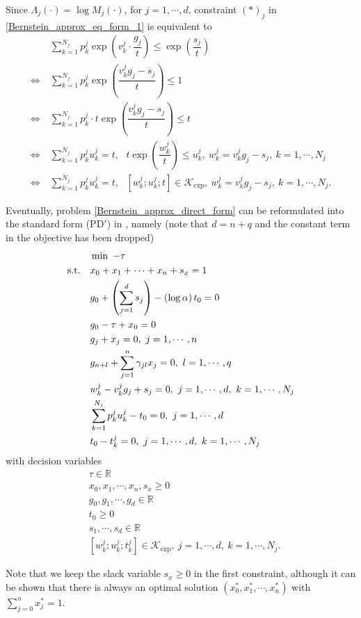 \documentclass[11pt]{article}
\begin{document}
Since $\Lambda_j\left(\cdot\right) = \log M_j \left(\cdot\right)$, for $j=1, \cdots, d$, constraint $(*)_j$ in \eqref{Bernstein_approx_eq_form_1} is equivalent to 
\begin{align*}
&\sum_{k=1}^{N_j} p_k^j \exp \left(v_k^j \cdot \dfrac{g_j}{t}\right) \leq \exp\left(\dfrac{s_j}{t}\right) \\
\Leftrightarrow\ & \sum_{k=1}^{N_j} p_k^j \exp\left(\dfrac{v_k^j g_j - s_j}{t}\right) \leq 1 \\
\Leftrightarrow\ & \sum_{k=1}^{N_j} p_k^j\cdot  t \exp\left(\dfrac{v_k^j g_j - s_j}{t}\right) \leq t \\
\Leftrightarrow\ & \sum_{k=1}^{N_j} p_k^ju_k^j = t,\ \ \ t\exp\left(\dfrac{w_k^j}{t}\right) \leq u_k^j,\ w_k^j =v_k^j g_j - s_j,\ k = 1, \cdots, N_j \\
\Leftrightarrow\ & \sum_{k=1}^{N_j} p_k^ju_k^j = t,\ \ \ \left[w_k^j; u_k^j; t\right] \in \mathcal{K}_{\exp},\ w_k^j =v_k^j g_j - s_j,\ k = 1, \cdots, N_j.
\end{align*}

Eventually, problem \eqref{Bernstein_approx_direct_form} can be reformulated into the standard form (PD$'$) in \cite{Gao_Yuan_thesis}, namely (note that $d = n+q$ and the constant term in the objective has been dropped)
\begin{align}
\begin{split}\label{reformulated_std_conic_form}
&\min \ -\tau \\ 
\textnormal{s.t.}\ \ \ & x_0 + x_1 + \cdots + x_n + s_x = 1 \\
& g_0 + \left(\sum_{j=1}^d s_j\right) - \left(\log \alpha\right) t_0 = 0 \\
& g_0  - \tau + x_0 = 0 \\
& g_j + x_j = 0,\ j = 1, \cdots, n \\
& g_{n+l} + \sum_{j=1}^n \gamma_{jl} x_j = 0,\ l = 1, \cdots, q \\
& w_k^j - v_k^j g_j + s_j = 0,\ j = 1, \cdots,d,\ k = 1, \cdots, N_j \\
& \sum_{k=1}^{N_j} p_k^j u_k^j - t_0 = 0,\  j =1,\cdots,d \\
& t_0 - t_k^j = 0,\ j = 1,\cdots, d,\ k = 1,\cdots,N_j
\end{split}
\end{align}
with decision variables
\begin{align*}
& \tau \in \mathbb{R} \\
& x_0, x_1, \cdots, x_n, s_x \geq 0 \\
& g_0, g_1, \cdots, g_d \in \mathbb{R} \\
& t_0 \geq 0 \\
& s_1, \cdots, s_d \in \mathbb{R} \\
& \left[w_k^j; u_k^j; t_k^j\right] \in \mathcal{K}_{\exp},\ j = 1, \cdots, d,\ k = 1,\cdots, N_j.
\end{align*}

Note that we keep the slack variable $s_x \geq 0$ in the first constraint, although it can be shown that there is always an optimal solution $\left(x_0^*, x_1^*, \cdots, x_n^*\right)$ with $\sum_{j=0}^n x_j^* = 1$.

{}

\end{document}
